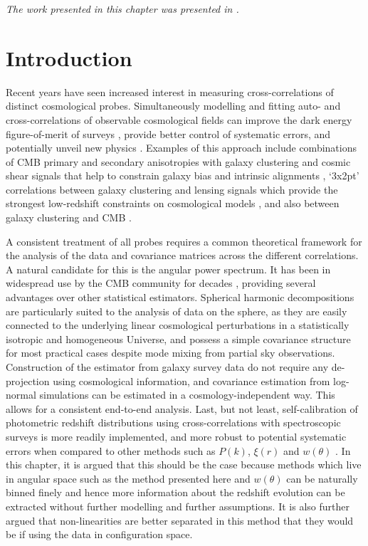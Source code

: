 \textit{The work presented in this chapter was presented in \citet{2018LoureiroBOSS}.} 

\newpage
\section{Introduction}\label{sec:BOSS:intro}
Recent years have seen increased interest in measuring cross-correlations of distinct cosmological probes. Simultaneously modelling and fitting auto- and cross-correlations of observable cosmological fields can improve the dark energy figure-of-merit of surveys \citep{2008PhRvD..77l3525W}, provide better control of systematic errors, and potentially unveil new physics \citep[e.g.][]{Kirk2015}. Examples of this approach include combinations of CMB primary and secondary anisotropies with galaxy clustering and cosmic shear signals that help to constrain galaxy bias and intrinsic alignments \citep{Giannantonio2016, Hand2015}, `3x2pt' correlations between galaxy clustering and lensing signals which provide the strongest low-redshift constraints on cosmological models \citep{2017MNRAS.465.1454H, 2017arXiv170801530D}, and also between galaxy clustering and CMB \citep{2016Nicola, 2017Nicola, Doux2017}.

\qquad A consistent treatment of all probes requires a common theoretical framework for the analysis of the data and covariance matrices across the different correlations. A natural candidate for this is the angular power spectrum. It has been in widespread use by the CMB community for decades \citep{COBE,Healpix,Polspice0,PolSpiceSzapudi2001,PolSpice2001}, providing several advantages over other statistical estimators. Spherical harmonic decompositions are particularly suited to the analysis of data on the sphere, as they are easily connected to the underlying linear cosmological perturbations in a statistically isotropic and homogeneous Universe, and possess a simple covariance structure for most practical cases despite mode mixing from partial sky observations. Construction of the estimator from galaxy survey data do not require any de-projection using cosmological information, and covariance estimation from log-normal simulations can be estimated in a cosmology-independent way. This allows for a consistent end-to-end analysis. Last, but not least, self-calibration of photometric redshift distributions using cross-correlations with spectroscopic surveys is more readily implemented, and more robust to potential systematic errors \citep{McQuinnWhite2013, 2016McLeod} when compared to other methods such as $P(k)$, $\xi(r)$ and $w(\theta)$ \citep{2017RossBOSS,2017SalazarBOSSwTheta}.  In this chapter, it is argued that this should be the case because methods which live in angular space such as the method presented here and $w(\theta)$ can be naturally binned finely and hence more information about the redshift evolution can be extracted without further modelling and further assumptions. It is also further argued that non-linearities are better separated in this method that they would be if using the data in configuration space.


